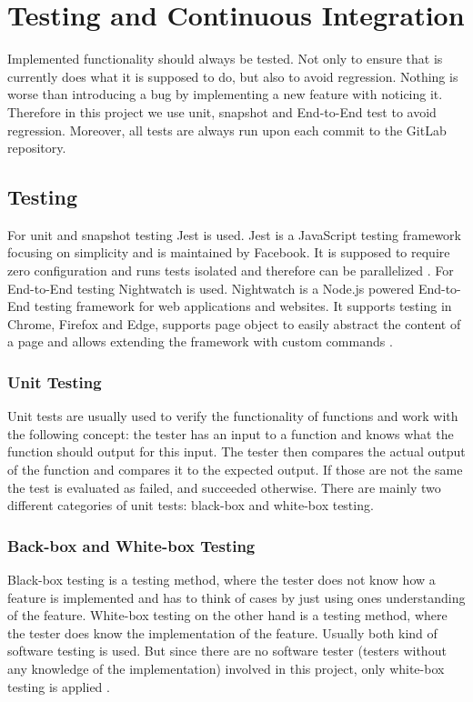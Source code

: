 \chapter{Testing and Continuous Integration}
\label{chapter:testingAndCI}

Implemented functionality should always be tested. Not only to ensure that is currently does what it is supposed to do, but also to avoid regression. Nothing is worse than introducing a bug by implementing a new feature with noticing it. Therefore in this project we use unit, snapshot and End-to-End test to avoid regression.
Moreover, all tests are always run upon each commit to the GitLab repository.

\section{Testing}
\label{section:testing}
For unit and snapshot testing Jest is used. Jest is a JavaScript testing framework focusing on simplicity and is maintained by Facebook. It is supposed to require zero configuration and runs tests isolated and therefore can be parallelized \cite{Jest}. For End-to-End testing Nightwatch is used. Nightwatch is a Node.js powered End-to-End testing framework for web applications and websites. It supports testing in Chrome, Firefox and Edge, supports page object to easily abstract the content of a page and allows extending the framework with custom commands \cite{Nightwatch}.

\subsection{Unit Testing}
\label{subsection:unitTesting}
Unit tests are usually used to verify the functionality of functions and work with the following concept: the tester has an input to a function and knows what the function should output for this input. The tester then compares the actual output of the function and compares it to the expected output. If those are not the same the test is evaluated as failed, and succeeded otherwise.
There are mainly two different categories of unit tests: black-box and white-box testing.

\subsection*{Back-box and White-box Testing}
Black-box testing is a testing method, where the tester does not know how a feature is implemented and has to think of cases by just using ones understanding of the feature. White-box testing on the other hand is a testing method, where the tester does know the implementation of the feature. Usually both kind of software testing is used. But since there are no software tester  (testers without any knowledge of the implementation) involved in this project, only white-box testing is applied \cite{BlackBoxWhiteBoxTesting}.

